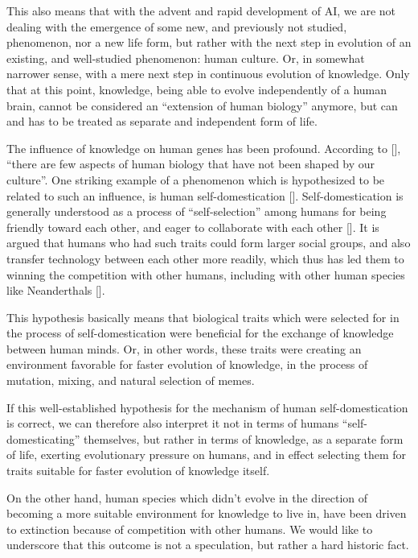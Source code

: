 \documentclass[12pt]{article}
\newcommand{\citestrut}[1]{\vphantom{[}{#1}\vphantom{]}}
\renewcommand{\cite}[1]{[\hyperlink{#1}{\citestrut{#1}}]}
\begin{document}
This also means that with the advent and rapid development of AI, we are not dealing with
the emergence of some new, and previously not studied, phenomenon, nor a new life form,
but rather with the next step in evolution of an existing, and well-studied phenomenon:
human culture. Or, in somewhat narrower sense, with a mere next step in continuous
evolution of knowledge. Only that at this point, knowledge, being able to evolve
independently of a human brain, cannot be considered an ``extension of human biology''
anymore, but can and has to be treated as separate and independent form of life.

The influence of knowledge on human genes has been profound. According to \cite{Culture},
``there are few aspects of human biology that have not been shaped by our culture''. One
striking example of a phenomenon which is hypothesized to be related to such an
influence, is human self-domestication \cite{SelfDomestication}. Self-domestication is
generally understood as a process of ``self-selection'' among humans for being friendly
toward each other, and eager to collaborate with each other \cite{GoodnessParadox}. It is
argued that humans who had such traits could form larger social groups, and also transfer
technology between each other more readily, which thus has led them to winning the
competition with other humans, including with other human species like Neanderthals
\cite{SelfDomestication}.

This hypothesis basically means that biological traits which were selected for in the
process of self-domestication were beneficial for the exchange of knowledge between human
minds. Or, in other words, these traits were creating an environment favorable for faster
evolution of knowledge, in the process of mutation, mixing, and natural selection of
memes.

If this well-established hypothesis for the mechanism of human self-domestication is
correct, we can therefore also interpret it not in terms of humans ``self-domesticating''
themselves, but rather in terms of knowledge, as a separate form of life, exerting
evolutionary pressure on humans, and in effect selecting them for traits suitable for
faster evolution of knowledge itself.

On the other hand, human species which didn't evolve in the direction of becoming a more
suitable environment for knowledge to live in, have been driven to extinction because of
competition with other humans. We would like to underscore that this outcome is not a
speculation, but rather a hard historic fact.
\end{document}
